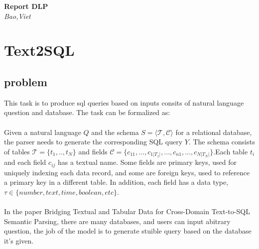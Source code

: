 \documentclass[10pt,a4paper]{article}
\begin{document}
\begin{titlepage}
\begin{center}
\Large\textbf{Report DLP}\\
\large\textit{Bao,Viet}
\end{center}
\end{titlepage}
\section{Text2SQL}
\subsection{problem}
This task is to produce sql queries based on inputs consits of natural language question and database. The task can be formalized as: \\\\
Given a natural language $Q$ and the schema $S = \langle \mathcal{T},\mathcal{C}\rangle$ for a relational database, the parser needs to generate the corresponding SQL query $Y$. The schema consists of tables $\mathcal{T} = \{t_1,..,t_N\}$ and fields $\mathcal{C} =\{c_{11},...,c_{1|T_1|},...,c_{n1},...,c_{N|T_N|} \}$.Each table $t_i$ and each field $c_{ij}$ has a textual name. Some fields are primary keys, used for uniquely indexing each data record, and some are foreign keys, used to reference a primary key in a different table. In addition, each field has a data type, $\tau\in\{number,text,time,boolean,etc\}$.\\\\
 In the paper Bridging Textual and Tabular Data for Cross-Domain Text-to-SQL Semantic Parsing, there are many databases, and users can input abitrary question, the job of the model is to generate stuible query based on the database it's given.
\end{document}

